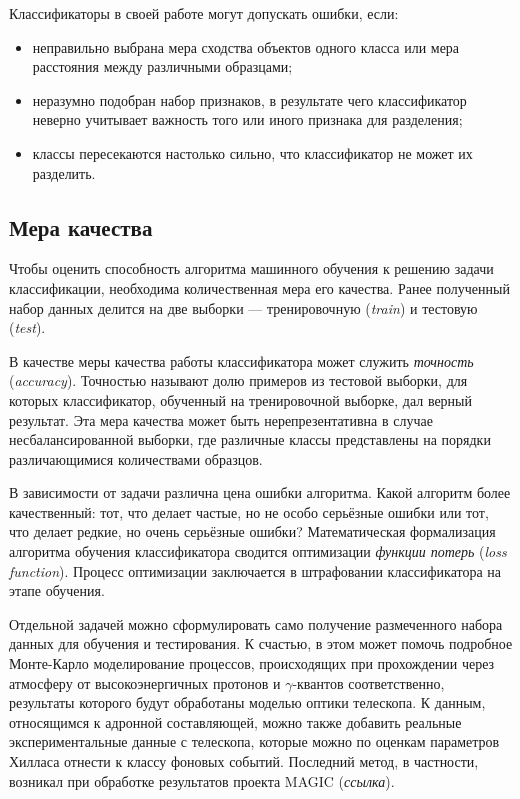 \documentclass[magd,floatypics,numeref]{msudipl} %
\begin{document}
Классификаторы в своей работе могут допускать ошибки, если:
\begin{itemize}
\item неправильно выбрана мера сходства объектов одного класса или мера расстояния между различными образцами;
\item неразумно подобран набор признаков, в результате чего классификатор неверно учитывает важность того или иного признака для разделения;
\item классы пересекаются настолько сильно, что классификатор не может их разделить.
\end{itemize}
\subsection{Мера качества}
Чтобы оценить способность алгоритма машинного обучения к решению задачи классификации, необходима количественная мера его качества. Ранее полученный набор данных делится на две выборки --- тренировочную (\textit{train}) и тестовую (\textit{test}). 

В качестве меры качества работы классификатора может служить \textit{точность} (\textit{accuracy}). Точностью называют долю примеров из тестовой выборки, для которых классификатор, обученный на тренировочной выборке, дал верный результат.  Эта мера качества может быть нерепрезентативна в случае несбалансированной выборки, где различные классы представлены на порядки различающимися количествами образцов. 

В зависимости от задачи различна цена ошибки алгоритма. Какой алгоритм более качественный: тот, что делает частые, но не особо серьёзные ошибки или тот, что делает редкие, но очень серьёзные ошибки? Математическая формализация алгоритма обучения классификатора сводится оптимизации \textit{функции потерь} (\textit{loss function}). Процесс оптимизации заключается в штрафовании классификатора на этапе обучения.

Отдельной задачей можно сформулировать само получение размеченного набора данных для обучения и тестирования. К счастью, в этом может помочь подробное Монте-Карло моделирование процессов, происходящих при прохождении через атмосферу от высокоэнергичных протонов и $\gamma$-квантов соответственно, результаты которого будут обработаны моделью оптики телескопа. К данным, относящимся к адронной составляющей, можно также добавить реальные экспериментальные данные с телескопа, которые можно по оценкам параметров Хилласа отнести к классу фоновых событий. Последний метод, в частности, возникал при обработке результатов проекта MAGIC (\textit{ссылка}).
\end{document}
